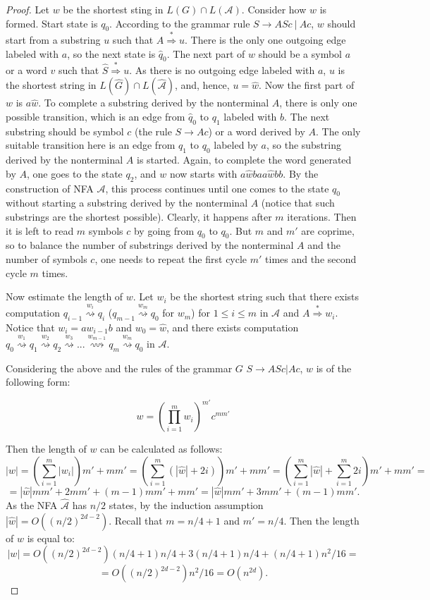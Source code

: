 \documentclass[11pt,a4paper]{article} %
\newcommand{\xra}[1]{\overset{#1}{\rightsquigarrow}}
\begin{document}
\begin{proof}
Let $w$ be the shortest sting in $L(G) \cap L(\mathcal{A})$. Consider how $w$ is formed. Start state is $q_{0}$. According to the grammar rule $S \rightarrow A S c\ \vert \ A c $, $w$ should start from a substring $u$ such that $A  \stackrel {*}{\Rightarrow } u$. There is the only one outgoing edge labeled with $a$, so the next state is $\hat{q}_{0}$. The next part of $w$ should be a symbol $a$  or a word $v$ such that $\hat{S}  \stackrel {*}{\Rightarrow } u$. As there is no outgoing edge labeled with $a$, $u$ is the shortest string in $L(\hat{G}) \cap L(\hat{\mathcal{A}})$, and, hence, $u = \hat{w}$. Now the first part of $w$ is $a \hat{w}$. To complete a substring derived by the nonterminal $A$, there is only one possible transition, which is an edge from $\hat{q}_{0}$ to $q_1$ labeled with $b$. The next substring should be symbol $c$ (the rule $S \rightarrow A c$) or a word derived by $A$. The only suitable transition here is an edge from $q_1$ to $q_0$ labeled by $a$, so the substring derived by the nonterminal $A$ is started. Again, to complete the word generated by $A$, one goes to the state $q_2$, and $w$ now starts with $a \hat{w} b a a \hat{w} b b$. By the construction of NFA $\mathcal{A}$, this process continues until one comes to the state $q_{0}$ without starting a substring derived by the nonterminal $A$ (notice that such substrings are the shortest possible). Clearly, it happens after $m$ iterations. Then it is left to read $m$ symbols $c$ by going from $q_{0}$ to $q_{0}$. But $m$ and $m'$ are coprime, so to balance the number of substrings derived by the nonterminal $A$ and the number of symbols $c$, one needs to repeat the first cycle $m'$ times and the second cycle $m$ times.

Now estimate the length of $w$. Let $w_i$ be the shortest string such that there exists computation $q_{i-1} \xra{w_i} q_i$ ($q_{m-1} \xra{w_m} q_0$ for $w_m$) for $1\leq i \leq m$ in $\mathcal{A}$ and $A  \stackrel {*}{\Rightarrow }  w_i$. Notice that $w_i = a w_{i-1} b$ and $w_0 = \hat{w}$, and there exists computation $q_{0} \xra{w_1} q_1  \xra{w_2} q_2 \xra{w_3} ... \xra{w_{m-1}} q_{m} \xra{w_m} q_0$ in $\mathcal{A}$.

Considering the above and the rules of the grammar $G$ $S \rightarrow ASc\vert Ac$, $w$ is of the following form:

$$w = ({\prod_{i=1}^m w_i})^{m'}{c}^{mm'}$$

Then the length of $w$ can be calculated as follows:
$$|w| = ({\sum_{i=1}^m |w_i|})m' + mm' = (\sum_{i=1}^m (|\hat{w}| + 2i))m' + mm'  = 
(\sum_{i=1}^m |\hat{w}| + \sum_{i=1}^m 2i)m' + mm' = $$
$$ =  |\hat{w}| m m' + 2mm' + (m-1)mm' + mm' = |\hat{w}| m m' + 3mm' + (m-1)mm'.
$$
As the NFA $\hat{\mathcal{A}}$ has $n/2$ states, by the induction assumption $|\hat{w}| =O( (n/2)^{2d - 2})$. Recall that $m = n/4 +1$ and $m' = n/4$. Then the length of $w$ is equal to:
$$|w| = O((n/2)^{2d - 2}) (n/4 + 1) n/4 + 3(n/4 + 1) n/4 + (n/4 + 1) n^2/16  =$$ $$= O((n/2)^{2d - 2}) n^2/16 = O(n^{2d}).$$


\end{proof}
\end{document}
